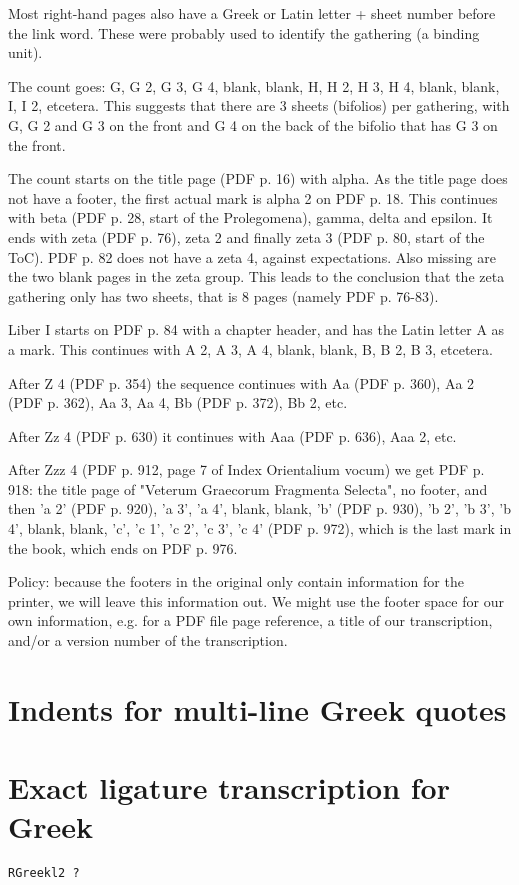 \documentclass{report}
\begin{document}
Most right-hand pages also have a Greek or Latin letter + sheet number before the link word.
These were probably used to identify the gathering (a binding unit).

The count goes:
G, G 2, G 3, G 4, blank, blank, H, H 2, H 3, H 4, blank, blank, I, I 2, etcetera.
This suggests that there are 3 sheets (bifolios) per gathering,
with G, G 2 and G 3 on the front and G 4 on the back of the bifolio that has G 3 on the front.

The count starts on the title page (PDF p. 16) with alpha. As the title page does not have a footer,
the first actual mark is alpha 2 on PDF p. 18.
This continues with
beta (PDF p. 28, start of the Prolegomena), gamma, delta and epsilon.
It ends with zeta (PDF p. 76), zeta 2 and finally zeta 3 (PDF p. 80, start of the ToC). PDF p. 82 does not have a zeta 4, against expectations. Also missing are the two blank pages in the zeta group. This leads to the conclusion that the zeta gathering only has two sheets, that is 8 pages
(namely PDF p. 76-83).

Liber I starts on PDF p. 84 with a chapter header, and has the Latin letter A as a mark. This continues with A 2, A 3,
A 4, blank, blank, B, B 2, B 3, etcetera.

After Z 4 (PDF p. 354) the sequence continues with Aa (PDF p. 360), Aa 2 (PDF p. 362), Aa 3, Aa 4, Bb (PDF p. 372),
Bb 2, etc.

After Zz 4 (PDF p. 630) it continues with Aaa (PDF p. 636), Aaa 2, etc.

After Zzz 4 (PDF p. 912, page 7 of Index Orientalium vocum) we get PDF p. 918: the title page of "Veterum Graecorum Fragmenta Selecta", no footer, and then 'a 2' (PDF p. 920), 'a 3', 'a 4', blank, blank, 'b' (PDF p. 930), 'b 2', 'b 3', 'b 4', blank, blank, 'c', 'c 1', 'c 2', 'c 3', 'c 4' (PDF p. 972), which is the last mark in the book, which ends on PDF p. 976.

Policy: because the footers in the original only contain information for the printer, we will leave this information out.
We might use the footer space for our own information, e.g. for a PDF file page reference, a title of our transcription,
and/or a version number of the transcription.

\section{Indents for multi-line Greek quotes}

\section{Exact ligature transcription for Greek}

\texttt{RGreekl2 ?}
\end{document}

